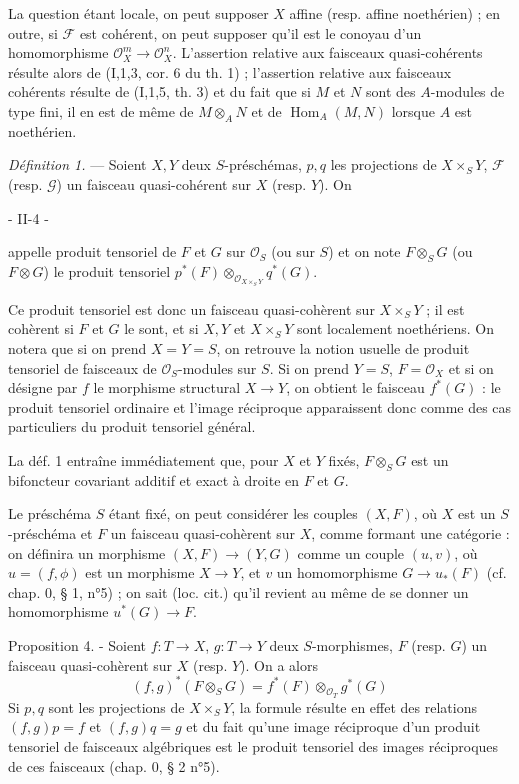 La question étant locale, on peut supposer $X$ affine (resp. affine noethérien) ; en outre, si $\mathcal{F}$ est cohérent, on peut supposer qu'il est le conoyau d'un homomorphisme $\mathcal{O}_X^m \to \mathcal{O}_X^n$. L'assertion relative aux faisceaux quasi-cohérents résulte alors de (I,1,3, cor. 6 du th. 1) ; l'assertion relative aux faisceaux cohérents résulte de (I,1,5, th. 3) et du fait que si $M$ et $N$ sont des $A$-modules de type fini, il en est de même de $M \otimes_A N$ et de $\operatorname{Hom}_A(M, N)$ lorsque $A$ est noethérien.

\noindent \emph{Définition 1.} — Soient $X, Y$ deux $S$-préschémas, $p, q$ les projections de $X \times_S Y$, $\mathcal{F}$ (resp. $\mathcal{G}$) un faisceau quasi-cohérent sur $X$ (resp. $Y$). On

\newpage


- II-4 -

appelle produit tensoriel de $F$ et $G$ sur $\mathcal{O}_S$ (ou sur $S$) et on note $F \otimes_S G$ (ou $F \otimes G$) le produit tensoriel $p^*(F) \otimes_{\mathcal{O}_{X \times_S Y}} q^*(G)$.

Ce produit tensoriel est donc un faisceau quasi-cohèrent sur $X \times_S Y$ ; il est cohèrent si $F$ et $G$ le sont, et si $X, Y$ et $X \times_S Y$ sont localement noethériens. On notera que si on prend $X=Y=S$, on retrouve la notion usuelle de produit tensoriel de faisceaux de $\mathcal{O}_S$-modules sur $S$. Si on prend $Y=S$, $F=\mathcal{O}_X$ et si on désigne par $f$ le morphisme structural $X \to Y$, on obtient le faisceau $f^*(G)$ : le produit tensoriel ordinaire et l'image réciproque apparaissent donc comme des cas particuliers du produit tensoriel général.

La déf. 1 entraîne immédiatement que, pour $X$ et $Y$ fixés, $F \otimes_S G$ est un bifoncteur covariant additif et exact à droite en $F$ et $G$.

Le préschéma $S$ étant fixé, on peut considérer les couples $(X, F)$, où $X$ est un $S$-préschéma et $F$ un faisceau quasi-cohèrent sur $X$, comme formant une catégorie : on définira un morphisme $(X, F) \to (Y, G)$ comme un couple $(u, v)$, où $u=(f, \phi)$ est un morphisme $X \to Y$, et $v$ un homomorphisme $G \to u_*(F)$ (cf. chap. 0, § 1, n°5) ; on sait (loc. cit.) qu'il revient au même de se donner un homomorphisme $u^*(G) \to F$.

Proposition 4. - Soient $f : T \to X$, $g : T \to Y$ deux $S$-morphismes, $F$ (resp. $G$) un faisceau quasi-cohèrent sur $X$ (resp. $Y$). On a alors
$$(f, g)^*(F \otimes_S G) = f^*(F) \otimes_{\mathcal{O}_T} g^*(G)$$
Si $p, q$ sont les projections de $X \times_S Y$, la formule résulte en effet des relations $(f, g)p = f$ et $(f, g)q = g$ et du fait qu'une image réciproque d'un produit tensoriel de faisceaux algébriques est le produit tensoriel des images réciproques de ces faisceaux (chap. 0, § 2 n°5).

